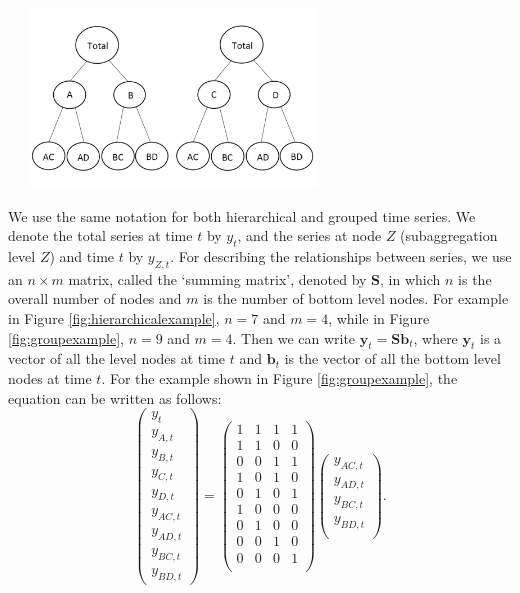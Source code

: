 \documentclass[11pt,a4paper,]{article}
\let\origfigure\figure
\let\endorigfigure\endfigure
\renewenvironment{figure}[1][2] {
    \expandafter\origfigure\expandafter[!htbp]
} {
    \endorigfigure
}
\begin{document}
\begin{figure}

{\centering \includegraphics[width=330px,height=180px]{hcf_files/figure-latex/groupexample-1} 

}

\caption{An example of a two level grouped structure.}\label{fig:groupexample}
\end{figure}

We use the same notation \autocite[following][]{fpp2} for both
hierarchical and grouped time series. We denote the total series at time
\(t\) by \(y_t\), and the series at node \(Z\) (subaggregation level
\(Z\)) and time \(t\) by \(y_{Z,t}\). For describing the relationships
between series, we use an \(n\times m\) matrix, called the `summing
matrix', denoted by \(\bm{S}\), in which \(n\) is the overall number of
nodes and \(m\) is the number of bottom level nodes. For example in
Figure \ref{fig:hierarchicalexample}, \(n = 7\) and \(m = 4\), while in
Figure \ref{fig:groupexample}, \(n=9\) and \(m=4\). Then we can write
\(\bm{y}_t=\bm{S}\bm{b}_t\), where \(\bm{y}_t\) is a vector of all the
level nodes at time \(t\) and \(\bm{b}_t\) is the vector of all the
bottom level nodes at time \(t\). For the example shown in Figure
\ref{fig:groupexample}, the equation can be written as follows:
\begin{equation}\label{eq:Smatrixexample}
\begin{pmatrix}
  y_{t}\\y_{A,t}\\y_{B,t}\\y_{C,t}\\y_{D,t}\\y_{AC,t}\\y_{AD,t}\\y_{BC,t}\\y_{BD,t}
\end{pmatrix} =
\begin{pmatrix}
  1&1&1&1\\1&1&0&0\\0&0&1&1\\1&0&1&0\\0&1&0&1\\1&0&0&0\\0&1&0&0\\0&0&1&0\\0&0&0&1\\
\end{pmatrix}
\begin{pmatrix}
  y_{AC,t}\\y_{AD,t}\\y_{BC,t}\\y_{BD,t}\\
\end{pmatrix}.
\end{equation}
\end{document}
